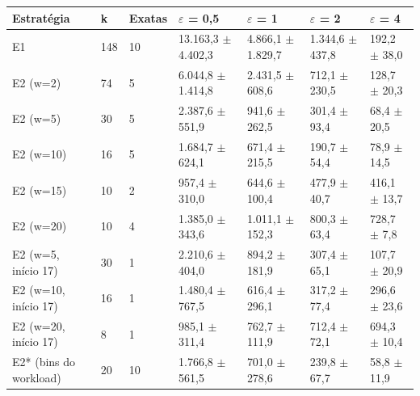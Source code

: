 \begin{tabular}{lllllll}
\toprule
Estratégia & k & Exatas & $\varepsilon$ = 0,5 & $\varepsilon$ = 1 & $\varepsilon$ = 2 & $\varepsilon$ = 4 \\
\midrule
E1 & 148 & 10 & 13.163,3 $\pm$ 4.402,3 & 4.866,1 $\pm$ 1.829,7 & 1.344,6 $\pm$ 437,8 & 192,2 $\pm$ 38,0 \\
E2 (w=2) & 74 & 5 & 6.044,8 $\pm$ 1.414,8 & 2.431,5 $\pm$ 608,6 & 712,1 $\pm$ 230,5 & 128,7 $\pm$ 20,3 \\
E2 (w=5) & 30 & 5 & 2.387,6 $\pm$ 551,9 & 941,6 $\pm$ 262,5 & 301,4 $\pm$ 93,4 & 68,4 $\pm$ 20,5 \\
E2 (w=10) & 16 & 5 & 1.684,7 $\pm$ 624,1 & 671,4 $\pm$ 215,5 & 190,7 $\pm$ 54,4 & 78,9 $\pm$ 14,5 \\
E2 (w=15) & 10 & 2 & 957,4 $\pm$ 310,0 & 644,6 $\pm$ 100,4 & 477,9 $\pm$ 40,7 & 416,1 $\pm$ 13,7 \\
E2 (w=20) & 10 & 4 & 1.385,0 $\pm$ 343,6 & 1.011,1 $\pm$ 152,3 & 800,3 $\pm$ 63,4 & 728,7 $\pm$ 7,8 \\
E2 (w=5, início 17) & 30 & 1 & 2.210,6 $\pm$ 404,0 & 894,2 $\pm$ 181,9 & 307,4 $\pm$ 65,1 & 107,7 $\pm$ 20,9 \\
E2 (w=10, início 17) & 16 & 1 & 1.480,4 $\pm$ 767,5 & 616,4 $\pm$ 296,1 & 317,2 $\pm$ 77,4 & 296,6 $\pm$ 23,6 \\
E2 (w=20, início 17) & 8 & 1 & 985,1 $\pm$ 311,4 & 762,7 $\pm$ 111,9 & 712,4 $\pm$ 72,1 & 694,3 $\pm$ 10,4 \\
E2* (bins do workload) & 20 & 10 & 1.766,8 $\pm$ 561,5 & 701,0 $\pm$ 278,6 & 239,8 $\pm$ 67,7 & 58,8 $\pm$ 11,9 \\
\bottomrule
\end{tabular}
